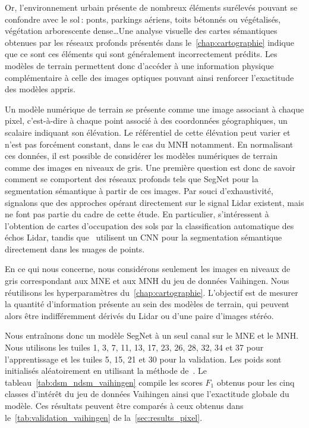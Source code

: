 Or, l'environnement urbain présente de nombreux éléments surélevés pouvant se confondre avec le sol\,: ponts, parkings aériens, toits bétonnés ou végétalisés, végétation arborescente dense\dots Une analyse visuelle des cartes sémantiques obtenues par les réseaux profonds présentés dans le~\cref{chap:cartographie} indique que ce sont ces éléments qui sont généralement incorrectement prédits. Les modèles de terrain permettent donc d'accéder à une information physique complémentaire à celle des images optiques pouvant ainsi renforcer l'exactitude des modèles appris.

Un modèle numérique de terrain se présente comme une image associant à chaque pixel, c'est-à-dire à chaque point associé à des coordonnées géographiques, un scalaire indiquant son élévation. Le référentiel de cette élévation peut varier et n'est pas forcément constant, dans le cas du \gls{MNH} notamment. En normalisant ces données, il est possible de considérer les modèles numériques de terrain comme des images en niveaux de gris. Une première question est donc de savoir comment se comportent des réseaux profonds tels que SegNet pour la segmentation sémantique à partir de ces images. Par souci d'exhaustivité, signalons que des approches opérant directement sur le signal \gls{Lidar} existent, mais ne font pas partie du cadre de cette étude. En particulier, \citet{yan_urban_2015} s'intéressent à l'obtention de cartes d'occupation des sols par la classification automatique des échos \gls{Lidar}, tandis que~\citet{yang_convolutional_2017} utilisent un \gls{CNN} pour la segmentation sémantique directement dans les nuages de points.

En ce qui nous concerne, nous considérons seulement les images en niveaux de gris correspondant aux \gls{MNE} et aux \gls{MNH} du jeu de données  Vaihingen. Nous réutilisons les hyperparamètres du~\cref{chap:cartographie}. L'objectif est de mesurer la quantité d'information présente au sein des modèles de terrain, qui peuvent alors être indifféremment dérivés du \gls{Lidar} ou d'une paire d'images stéréo.

Nous entraînons donc un modèle \gls{SegNet} à un seul canal sur le \gls{MNE} et le \gls{MNH}. Nous utilisons les tuiles 1, 3, 7, 11, 13, 17, 23, 26, 28, 32, 34 et 37 pour l'apprentissage et les tuiles 5, 15, 21 et 30 pour la validation. Les poids sont initialisés aléatoirement en utilisant la méthode de~\citet{he_delving_2015}. Le tableau~\cref{tab:dsm_ndsm_vaihingen} compile les scores $F_1$ obtenus pour les cinq classes d'intérêt du jeu de données  Vaihingen ainsi que l'exactitude globale du modèle. Ces résultats peuvent être comparés à ceux obtenus dans le~\cref{tab:validation_vaihingen} de la~\cref{sec:results_pixel}.

